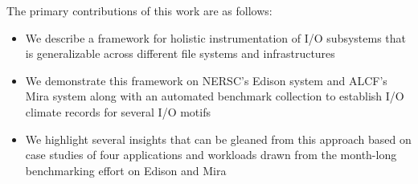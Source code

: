 The primary contributions of this work are as follows:

\begin{itemize}
\item We describe a framework for holistic instrumentation of I/O subsystems that is generalizable across different file systems and infrastructures 
\item We demonstrate this framework on NERSC's Edison system and ALCF's Mira system along with an automated benchmark collection to establish I/O climate records for several I/O motifs
\item We highlight several insights that can be gleaned from this approach based on case studies of four applications and workloads drawn from the month-long benchmarking effort on Edison and Mira
\end{itemize}
